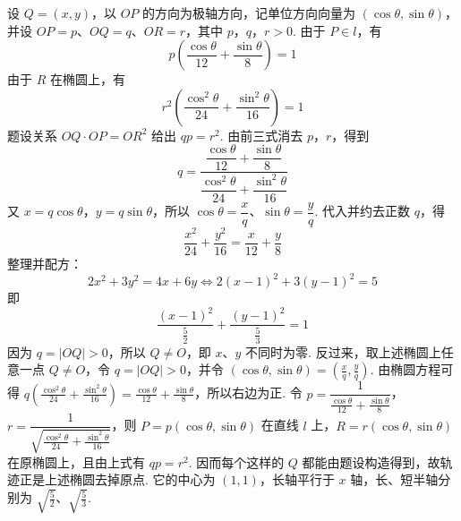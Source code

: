 \begin{solution}
设 \(Q=(x,y)\)，以 \(OP\) 的方向为极轴方向，记单位方向向量为 \((\cos\theta,\sin\theta)\)，并设 \(OP=p\)、\(OQ=q\)、\(OR=r\)，其中 \(p\)，\(q\)，\(r>0\). 由于 \(P\in l\)，有
\[
p\left(\frac{\cos\theta}{12}+\frac{\sin\theta}{8}\right)=1
\]
由于 \(R\) 在椭圆上，有
\[
r^2\left(\frac{\cos^2\theta}{24}+\frac{\sin^2\theta}{16}\right)=1
\]
题设关系 \(OQ\cdot OP=OR^2\) 给出 \(q p=r^2\). 由前三式消去 \(p\)，\(r\)，得到
\[
q=\frac{\dfrac{\cos\theta}{12}+\dfrac{\sin\theta}{8}}
{\dfrac{\cos^2\theta}{24}+\dfrac{\sin^2\theta}{16}}
\]
又 \(x=q\cos\theta\)，\(y=q\sin\theta\)，所以 \(\cos\theta=\dfrac{x}{q}\)、\(\sin\theta=\dfrac{y}{q}\). 代入并约去正数 \(q\)，得
\[
\frac{x^2}{24}+\frac{y^2}{16}=\frac{x}{12}+\frac{y}{8}
\]
整理并配方：
\[
2x^2+3y^2=4x+6y
\Longleftrightarrow 2(x-1)^2+3(y-1)^2=5
\]
即
\[
\frac{(x-1)^2}{\frac52}+\frac{(y-1)^2}{\frac53}=1
\]
因为 \(q=|OQ|>0\)，所以 \(Q\ne O\)，即 \(x\)、\(y\) 不同时为零. 反过来，取上述椭圆上任意一点 \(Q\ne O\)，令 \(q=|OQ|>0\)，并令 \((\cos\theta,\sin\theta)=(\frac{x}{q},\frac{y}{q})\). 由椭圆方程可得 \(q\left(\frac{\cos^2\theta}{24}+\frac{\sin^2\theta}{16}\right)=\frac{\cos\theta}{12}+\frac{\sin\theta}{8}\)，所以右边为正. 令 \(p=\dfrac{1}{\frac{\cos\theta}{12}+\frac{\sin\theta}{8}}\)，\(r=\dfrac{1}{\sqrt{\frac{\cos^2\theta}{24}+\frac{\sin^2\theta}{16}}}\)，则 \(P=p(\cos\theta,\sin\theta)\) 在直线 \(l\) 上，\(R=r(\cos\theta,\sin\theta)\) 在原椭圆上，且由上式有 \(qp=r^2\). 因而每个这样的 \(Q\) 都能由题设构造得到，故轨迹正是上述椭圆去掉原点. 它的中心为 \((1,1)\)，长轴平行于 \(x\) 轴，长、短半轴分别为 \(\sqrt{\frac52}\)、\(\sqrt{\frac53}\).
\end{solution}
